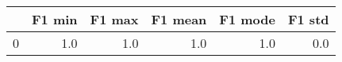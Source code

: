 \begin{tabular}{lrrrrr}
\toprule
{} &  F1 min &  F1 max &  F1 mean &  F1 mode &  F1 std \\
\midrule
0 &     1.0 &     1.0 &      1.0 &      1.0 &     0.0 \\
\bottomrule
\end{tabular}
